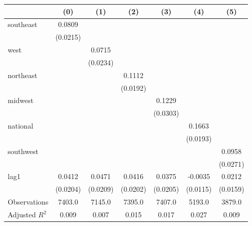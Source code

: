 \begin{tabular}{lcccccc}
\toprule
 & (0) & (1) & (2) & (3) & (4) & (5) \\
\midrule
southeast & 0.0809 &  &  &  &  &  \\
\vspace{0.2cm}
 & (0.0215) &  &  &  &  &  \\
west &  & 0.0715 &  &  &  &  \\
\vspace{0.2cm}
 &  & (0.0234) &  &  &  &  \\
northeast &  &  & 0.1112 &  &  &  \\
\vspace{0.2cm}
 &  &  & (0.0192) &  &  &  \\
midwest &  &  &  & 0.1229 &  &  \\
\vspace{0.2cm}
 &  &  &  & (0.0303) &  &  \\
national &  &  &  &  & 0.1663 &  \\
\vspace{0.2cm}
 &  &  &  &  & (0.0193) &  \\
southwest &  &  &  &  &  & 0.0958 \\
\vspace{0.2cm}
 &  &  &  &  &  & (0.0271) \\
lag1 & 0.0412 & 0.0471 & 0.0416 & 0.0375 & -0.0035 & 0.0212 \\
\vspace{0.2cm}
 & (0.0204) & (0.0209) & (0.0202) & (0.0205) & (0.0115) & (0.0159) \\
\midrule
Observations & 7403.0 & 7145.0 & 7395.0 & 7407.0 & 5193.0 & 3879.0 \\
Adjusted $R^2$ & 0.009 & 0.007 & 0.015 & 0.017 & 0.027 & 0.009 \\
\bottomrule
\end{tabular}